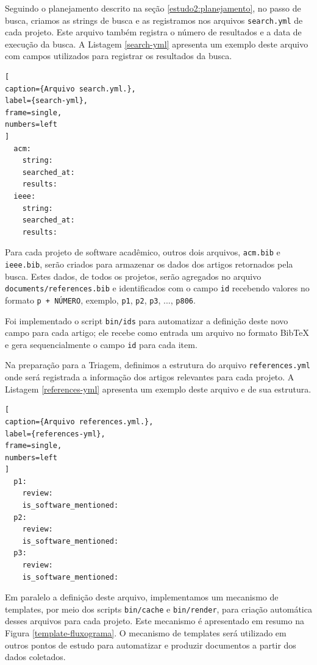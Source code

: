 Seguindo o planejamento descrito na seção \ref{estudo2:planejamento},
no passo de busca, 
criamos as strings de busca e as registramos nos arquivos \texttt{search.yml} de cada
projeto. Este arquivo também registra o número de resultados e a data de
execução da busca. A Listagem \ref{search-yml} apresenta um exemplo deste
arquivo com campos utilizados para registrar os resultados da busca.

\begin{lstlisting}[
caption={Arquivo search.yml.},
label={search-yml},
frame=single,
numbers=left
]
  acm:
    string:
    searched_at:
    results:
  ieee:
    string:
    searched_at:
    results:
\end{lstlisting}

Para cada projeto de software acadêmico, outros dois arquivos,
\texttt{acm.bib} e \texttt{ieee.bib}, serão criados para armazenar os dados dos artigos
retornados pela busca. Estes dados, de todos os projetos, serão agregados no
arquivo \texttt{documents/references.bib} e identificados com
o campo \texttt{id} recebendo valores no formato \texttt{p + NÚMERO},
exemplo, \texttt{p1}, \texttt{p2}, \texttt{p3}, ..., \texttt{p806}.

Foi implementado o script \texttt{bin/ids} para automatizar a
definição deste novo campo para cada artigo; ele recebe como entrada um arquivo
no formato BibTeX e gera sequencialmente o campo \texttt{id} para cada item.

Na preparação para a Triagem,
definimos a estrutura do arquivo \texttt{references.yml} onde será registrada a
informação dos artigos relevantes para cada projeto. A Listagem
\ref{references-yml} apresenta um exemplo deste arquivo e de sua estrutura.

\begin{lstlisting}[
caption={Arquivo references.yml.},
label={references-yml},
frame=single,
numbers=left
]
  p1:
    review:
    is_software_mentioned:
  p2:
    review:
    is_software_mentioned:
  p3:
    review:
    is_software_mentioned:
\end{lstlisting}

Em paralelo a definição deste arquivo, implementamos um mecanismo de templates,
por meio dos scripts \texttt{bin/cache} e \texttt{bin/render}, para criação
automática desses arquivos para cada projeto. 
Este mecanismo é apresentado em resumo na Figura
\ref{template-fluxograma}.
O mecanismo de templates será
utilizado em outros pontos de estudo para automatizar e produzir documentos a
partir dos dados coletados.

